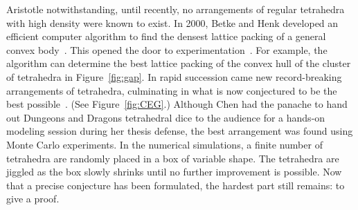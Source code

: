 \documentclass{llncs}
\begin{document}
Aristotle notwithstanding, until recently, no arrangements of regular
tetrahedra with high density were known to exist.  In 2000, Betke and
Henk developed an efficient computer algorithm to find the densest
lattice packing of a general convex body~\cite{BH2000}.  This opened
the door to experimentation~\cite{Conway-2006}.  For example,
the algorithm can determine the best lattice packing of the convex hull
of the cluster of tetrahedra in Figure~\ref{fig:gap}.  In rapid succession
came new record-breaking arrangements of tetrahedra, culminating in
what is now conjectured to be the best possible~\cite{Chen-2010}.
(See Figure~\ref{fig:CEG}.)  Although Chen had the panache to hand out
Dungeons and Dragons tetrahedral dice to the audience for a hands-on
modeling session during her thesis defense, the best arrangement was
found using Monte Carlo experiments.  In the numerical simulations, a
finite number of tetrahedra are randomly placed in a box of variable
shape.  The tetrahedra are jiggled as the box slowly shrinks until
no further improvement is possible.  Now that a precise conjecture has
been formulated, the hardest part still remains: to give a proof.
\end{document}
